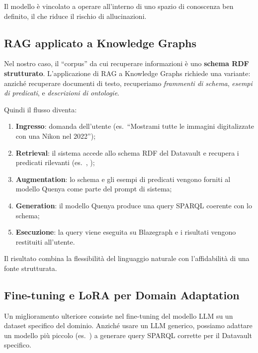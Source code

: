     Il modello è vincolato a operare all'interno di uno spazio di conoscenza ben definito, il che riduce il rischio di allucinazioni.

    \subsection{RAG applicato a Knowledge Graphs}\label{subsec:rag_kg}

    Nel nostro caso, il ``corpus'' da cui recuperare informazioni è uno \textbf{schema RDF strutturato}. L'applicazione di RAG a Knowledge Graphs richiede una variante: anziché recuperare documenti di testo, recuperiamo \textit{frammenti di schema}, \textit{esempi di predicati}, e \textit{descrizioni di ontologie}.

    Quindi il flusso diventa:

    \begin{enumerate}
        \item \textbf{Ingresso}: domanda dell'utente (es.\ ``Mostrami tutte le immagini digitalizzate con una Nikon nel 2022'');
        \item \textbf{Retrieval}: il sistema accede allo schema RDF del Datavault e recupera i predicati rilevanti (es.\ , );
        \item \textbf{Augmentation}: lo schema e gli esempi di predicati vengono forniti al modello Quenya come parte del prompt di sistema;
        \item \textbf{Generation}: il modello Quenya produce una query SPARQL coerente con lo schema;
        \item \textbf{Esecuzione}: la query viene eseguita su Blazegraph e i risultati vengono restituiti all'utente.
    \end{enumerate}

    Il risultato combina la flessibilità del linguaggio naturale con l'affidabilità di una fonte strutturata.

    \subsection{Fine-tuning e LoRA per Domain Adaptation}\label{subsec:finetune_lora}

    Un miglioramento ulteriore consiste nel fine-tuning del modello LLM su un dataset specifico del dominio. Anziché usare un LLM generico, possiamo adattare un modello più piccolo (es.\ ) a generare query SPARQL corrette per il Datavault specifico.

